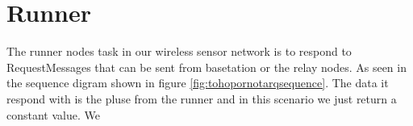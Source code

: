 \section{Runner}\label{sc:runner}
The runner nodes task in our wireless sensor network is to respond to RequestMessages that can be sent from basetation or the relay nodes. As seen in the sequence digram shown in figure \ref{fig:tohopornotarqsequence}. The data it respond with is the pluse from the runner and in this scenario we just return a constant value. We

\begin{lstlisting}[language=Python]

\end{lstlisting}